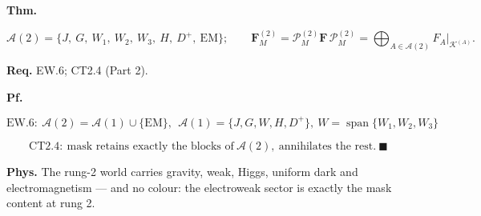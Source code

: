 \begin{theorem}\label{tag:EW-7}
\textbf{Thm.}

\[
\mathcal A(2)=\{J,\ G,\ W_1,\ W_2,\ W_3,\ H,\ D^+,\ \mathrm{EM}\};\qquad
\mathbf F_M^{(2)}=\mathcal P_M^{(2)}\mathbf F\,\mathcal P_M^{(2)}=\bigoplus_{A\in\mathcal A(2)}F_A\big|_{\mathcal K^{(A)}} .
\]

\textbf{Req.} EW.6; CT2.4 (Part 2).

\textbf{Pf.}

\[
\mathrm{EW.6}:\ \mathcal A(2)=\mathcal A(1)\cup\{\mathrm{EM}\},\ \ \mathcal A(1)=\{J,G,W,H,D^+\},\ W=\operatorname{span}\{W_1,W_2,W_3\}
\]

\[
\mathrm{CT2.4}:\ \text{mask retains exactly the blocks of}\ \mathcal A(2),\ \text{annihilates the rest}.\ \blacksquare
\]

\textbf{Phys.} The rung-2 world carries gravity, weak, Higgs, uniform dark and electromagnetism — and no colour: the electroweak sector is exactly the mask content at rung 2.

\end{theorem}


